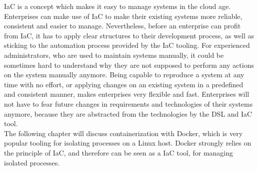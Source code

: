 IaC is a concept which makes it easy to manage systems in the cloud age. Enterprises can make use of IaC to make their existing systems more reliable, consistent and easier to manage. Nevertheless, before an enterprise can profit from IaC, it has to apply clear structures to their development process, as well as sticking to the automation process provided by the IaC tooling. For experienced administrators, who are used to maintain systems manually, it could be sometimes hard to understand why they are not supposed to perform any actions on the system manually anymore. Being capable to reproduce a system at any time with no effort, or applying changes on an existing system in a predefined and consistent manner, makes enterprises very flexible and fast. Enterprises will not have to fear future changes in requirements and technologies of their systems anymore, because they are abstracted from the technologies by the DSL and IaC tool. \\

The following chapter will discuss containerization with Docker, which is very popular tooling for isolating processes on a Linux host. Docker strongly relies on the principle of IaC, and therefore can be seen as a IaC tool, for managing isolated processes.    



